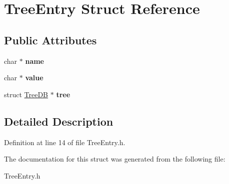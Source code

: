 \hypertarget{structTreeEntry}{
\section{TreeEntry Struct Reference}
\label{structTreeEntry}
}
\subsection*{Public Attributes}
\begin{DoxyCompactItemize}
\item 
\hypertarget{structTreeEntry_ad8130be0c0468f2cee63ca9dada55b17}{
char $\ast$ {\bfseries name}}
\label{structTreeEntry_ad8130be0c0468f2cee63ca9dada55b17}

\item 
\hypertarget{structTreeEntry_aa85271aec8e2e671789ce27cb96ffcc0}{
char $\ast$ {\bfseries value}}
\label{structTreeEntry_aa85271aec8e2e671789ce27cb96ffcc0}

\item 
\hypertarget{structTreeEntry_aa06f9e4ea4563630eedb7f13d539c32e}{
struct \hyperlink{structTreeDB}{TreeDB} $\ast$ {\bfseries tree}}
\label{structTreeEntry_aa06f9e4ea4563630eedb7f13d539c32e}

\end{DoxyCompactItemize}


\subsection{Detailed Description}


Definition at line 14 of file TreeEntry.h.



The documentation for this struct was generated from the following file:\begin{DoxyCompactItemize}
\item 
TreeEntry.h\end{DoxyCompactItemize}

